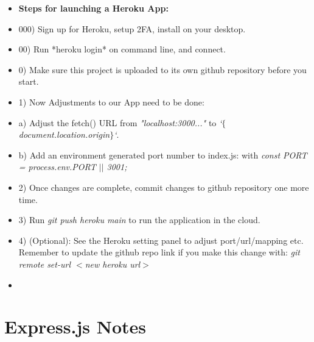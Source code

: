 \documentclass[8pt,a4paper]{extarticle}
\begin{document}
\begin{itemize}
\item \textbf{Steps for launching a Heroku App:}

\item 000) Sign up for Heroku, setup 2FA, install on your desktop.

\item 00) Run *heroku login* on command line, and connect.

\item 0) Make sure this project is uploaded to its own github repository before you start.

\item 1) Now Adjustments to our App need to be done:

\item a) Adjust the fetch() URL from \textit{"localhost:3000..."} to \textit{`$\{$document.location.origin$\}$`}.

\item   b) Add an environment generated port number to index.js: with \textit{const PORT = process.env.PORT $\vert \vert$ 3001;}

\item 2) Once changes are complete, commit changes to github repository one more time.

\item 3) Run \textit{git push heroku main} to run the application in the cloud.

\item 4) (Optional): See the Heroku setting panel to adjust port/url/mapping etc. Remember to update the github repo link if you make this change with:  \textit{git remote set-url $<$new heroku url$>$}

\item
\end{itemize}

\section{Express.js Notes}
\end{document}
